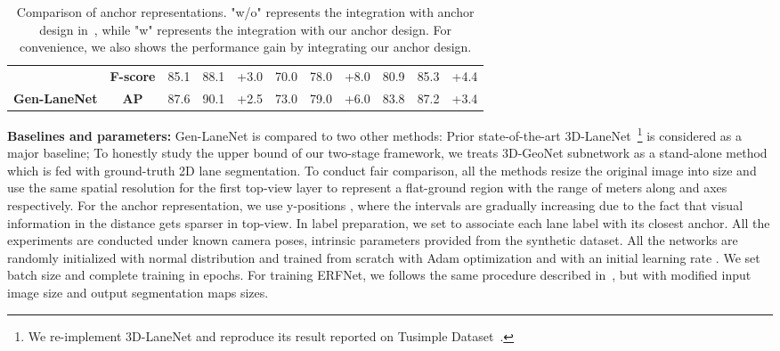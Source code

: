 \documentclass[10pt,twocolumn,letterpaper]{article}
\begin{document}
\begin{table*}[]
\begin{tabular}{|c|c|c|c|c|c|c|c|c|c|c|}
                                                               & \textbf{F-score}                        & 85.1                 & 88.1                 & {\color[HTML]{FE0000} +3.0}                & 70.0                   & 78.0                   & {\color[HTML]{FE0000} +8.0}                   & 80.9                     & 85.3                     & {\color[HTML]{FE0000} +4.4}                      \\ \cline{2-11} 
\multirow{-2}{*}{\textbf{Gen-LaneNet}}                         & \textbf{AP}                             & 87.6                 & 90.1                 & {\color[HTML]{FE0000} +2.5}                & 73.0                   & 79.0                   & {\color[HTML]{FE0000} +6.0}                   & 83.8                     & 87.2                     & {\color[HTML]{FE0000} +3.4}                      \\ \hline
\end{tabular}
\caption{Comparison of anchor representations. "w/o" represents the integration with anchor design in~\cite{Garnett:etal:ICCV2019}, while "w" represents the integration with our anchor design. For convenience, we also shows the performance gain by integrating our anchor design.}
\label{tab:anchor:compare}
\end{table*}


{\bf Baselines and parameters:} Gen-LaneNet is compared to two other methods: Prior state-of-the-art 3D-LaneNet~\cite{Garnett:etal:ICCV2019}\footnote{We re-implement 3D-LaneNet and reproduce its result reported on Tusimple Dataset~\cite{Tusimple2018}.} is considered as a major baseline; To honestly study the upper bound of our two-stage framework, we treats 3D-GeoNet subnetwork as a stand-alone method which is fed with ground-truth 2D lane segmentation. To conduct fair comparison, all the methods resize the original image into size  and use the same spatial resolution  for the first top-view layer to represent a flat-ground region with the range of  meters along  and  axes respectively. For the anchor representation, we use y-positions , where the intervals are gradually increasing due to the fact that visual information in the distance gets sparser in top-view. In label preparation, we set  to associate each lane label with its closest anchor. All the experiments are conducted under known camera poses, intrinsic parameters provided from the synthetic dataset. All the networks are randomly initialized with normal distribution and trained from scratch with Adam optimization and with an initial learning rate . We set batch size  and complete training in  epochs. For training ERFNet, we follows the same procedure described in~\cite{Romera:etal:ERFNet:TITS2018}, but with modified input image size and output segmentation maps sizes.
\end{document}
